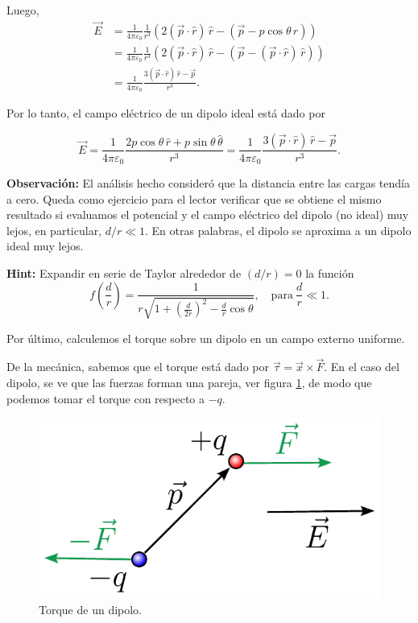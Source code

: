 Luego,
\begin{align*}
    \Vec{E} &= \frac{1}{4\pi \varepsilon_0} \frac{1}{r^3} \left(2(\Vec{p} \cdot \hat{r}) \,\hat{r} - (\Vec{p} - p \cos \theta \,\hat{r})  \right) \\
    &=\frac{1}{4\pi \varepsilon_0} \frac{1}{r^3} \left(2(\Vec{p} \cdot \hat{r}) \,\hat{r} - (\Vec{p} - (\Vec{p} \cdot \hat{r}) \,\hat{r})  \right) \\
    &= \frac{1}{4\pi\varepsilon_0} \frac{3(\Vec{p} \cdot \hat{r}) \,\hat{r} - \Vec{p}}{r^3}.
\end{align*}

Por lo tanto, el campo eléctrico de un dipolo ideal está dado por
\begin{shaded}
    $$\Vec{E} = \frac{1}{4\pi \varepsilon_0} \frac{2p \cos\theta\,\hat{r} + p\sin\theta\,\hat{\theta}}{r^3} = \frac{1}{4\pi\varepsilon_0} \frac{3(\Vec{p} \cdot \hat{r}) \,\hat{r} - \Vec{p}}{r^3}.$$
\end{shaded}

\textbf{Observación:} El análisis hecho consideró que la distancia entre las cargas tendía a cero. Queda como ejercicio para el lector verificar que se obtiene el mismo resultado si evaluamos el potencial y el campo eléctrico del dipolo (no ideal) muy lejos, en particular, $d/r \ll 1$. En otras palabras, el dipolo se aproxima a un dipolo ideal muy lejos.

\textbf{Hint:} Expandir en serie de Taylor alrededor de $(d/r) = 0$  la función
$$f\left( \frac{d}{r}\right) = \frac{1}{r\sqrt{1 + \left( \frac{d}{2r}\right)^2 - \frac{d}{r} \cos\theta}}, \quad \text{para} ~ \frac{d}{r} \ll 1.$$

Por último, calculemos el torque sobre un dipolo en un campo externo uniforme.

De la mecánica, sabemos que el torque está dado por $\vec{\tau} = \vec{x} \times \vec{F}$. En el caso del dipolo, se ve que las fuerzas forman una pareja, ver figura \ref{fig:Torque}, de modo que podemos tomar el torque con respecto a $-q$.

\begin{figure}[H]
    \centering
    \includegraphics[scale = 0.7]{Figuras/TorqueDipolo.pdf}
    \caption{Torque de un dipolo.}
    \label{fig:Torque}
\end{figure}

